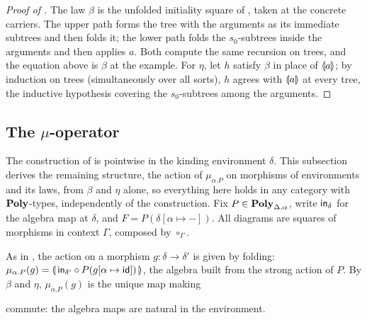 \begin{proof}[Proof of ]
The law $\beta$ is the unfolded initiality square of ,
taken at the concrete carriers. The upper path forms the tree with the arguments as its immediate
subtrees and then folds it; the lower path folds the $s_0$-subtrees inside the arguments and then
applies $a$. Both compute the same recursion on trees, and the equation above is $\beta$ at the
example. For $\eta$, let $h$ satisfy $\beta$ in place of $\llparenthesis a \rrparenthesis$; by induction on trees
(simultaneously over all sorts), $h$ agrees with $\llparenthesis a \rrparenthesis$ at every tree, the inductive
hypothesis covering the $s_0$-subtrees among the arguments.
\end{proof}

\subsection{The $\mu$-operator}
\label{sec:polynomial-types:mu-operator}

The construction of  is pointwise in the kinding environment
$\delta$. This subsection derives the remaining structure, the action of $\mu_{\alpha.P}$ on morphisms
of environments and its laws, from $\beta$ and $\eta$ alone, so everything here holds in any category
with $\mathbf{Poly}$-types, independently of the construction. Fix $P \in \mathbf{Poly}_{\Delta,\alpha}$, write
$\mathsf{in}_\delta$ for the algebra map at $\delta$, and $F = P(\delta[\alpha \mapsto -])$. All diagrams
are squares of morphisms in context $\Gamma$, composed by $\circ_\Gamma$.

As in \citet[Proposition~4]{nunes2023}, the action on a morphism $g : \delta \to \delta'$ is
given by folding: $\mu_{\alpha.P}(g) = \llparenthesis \,\mathsf{in}_{\delta'} \circ P(g[\alpha \mapsto \mathsf{id}])\, \rrparenthesis$,
the algebra built from the strong action of $P$. By $\beta$ and $\eta$, $\mu_{\alpha.P}(g)$ is the
unique map making
\begin{center}
\end{center}
commute: the algebra maps are natural in the environment.

